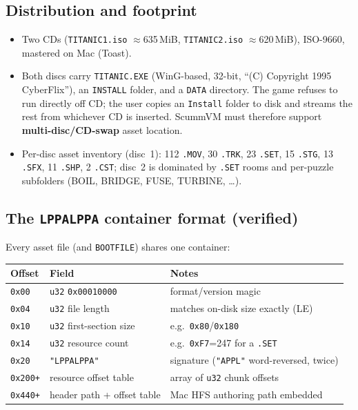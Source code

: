 \documentclass[11pt]{article}
\newcommand{\code}[1]{\texttt{#1}}
\begin{document}
\subsection{Distribution and footprint}
\begin{itemize}[nosep]
  \item Two CDs (\code{TITANIC1.iso} $\approx$635\,MiB, \code{TITANIC2.iso}
        $\approx$620\,MiB), ISO-9660, mastered on Mac (Toast).
  \item Both discs carry \code{TITANIC.EXE} (WinG-based, 32-bit, ``(C)
        Copyright 1995 CyberFlix''), an \code{INSTALL} folder, and a \code{DATA}
        directory. The game refuses to run directly off CD; the user copies an
        \code{Install} folder to disk and streams the rest from whichever CD is
        inserted. ScummVM must therefore support \textbf{multi-disc/CD-swap}
        asset location.
  \item Per-disc asset inventory (disc~1): 112 \code{.MOV}, 30 \code{.TRK},
        23 \code{.SET}, 15 \code{.STG}, 13 \code{.SFX}, 11 \code{.SHP},
        2 \code{.CST}; disc~2 is dominated by \code{.SET} rooms and per-puzzle
        subfolders (BOIL, BRIDGE, FUSE, TURBINE, \dots).
\end{itemize}

\subsection{The \code{LPPALPPA} container format (verified)}
Every asset file (and \code{BOOTFILE}) shares one container:
\begin{longtable}{@{}lll@{}}
\toprule
Offset & Field & Notes \\
\midrule
\code{0x00} & \code{u32} \code{0x00010000} & format/version magic \\
\code{0x04} & \code{u32} file length & matches on-disk size exactly (LE) \\
\code{0x10} & \code{u32} first-section size & e.g.\ \code{0x80}/\code{0x180} \\
\code{0x14} & \code{u32} resource count & e.g.\ \code{0xF7}=247 for a \code{.SET} \\
\code{0x20} & \code{"LPPALPPA"} & signature (\code{"APPL"} word-reversed, twice) \\
\code{0x200+} & resource offset table & array of \code{u32} chunk offsets \\
\code{0x440+} & header path + offset table & Mac HFS authoring path embedded \\
\bottomrule
\end{longtable}
\end{document}
